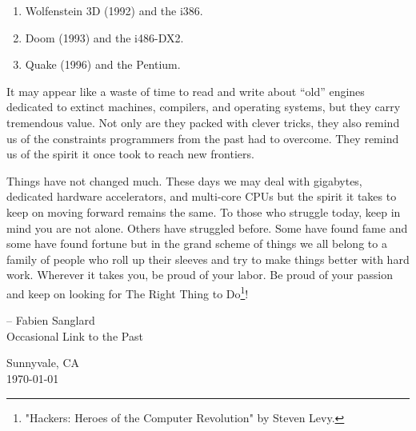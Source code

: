 \documentclass[book.tex]{subfiles}
\begin{document}
\begin{enumerate}
\item Wolfenstein 3D (1992) and the i386.
\item Doom (1993) and the i486-DX2.
\item Quake (1996) and the Pentium.
\end{enumerate}

\bigskip

It may appear like a waste of time to read and write about ``old'' engines dedicated to extinct machines, compilers, and operating systems, but they carry tremendous value. Not only are they packed with clever tricks, they also remind us of the constraints programmers from the past had to overcome. They remind us of the spirit it once took to reach new frontiers.\\
\par
Things have not changed much. These days we may deal with gigabytes, dedicated hardware accelerators, and multi-core CPUs but the spirit it takes to keep on moving forward remains the same. To those who struggle today, keep in mind you are not alone. Others have struggled before. Some have found fame and some have found fortune but in the grand scheme of things we all belong to a family of people who roll up their sleeves and try to make things better with hard work. Wherever it takes you, be proud of your labor. Be proud of your passion and keep on looking for The Right Thing to Do\footnote{"Hackers: Heroes of the Computer Revolution" by Steven Levy.}!\\
\par
-- Fabien Sanglard\\
Occasional Link to the Past\\
\par
Sunnyvale, CA\\
\monthyeardate\today\\
\end{document}
